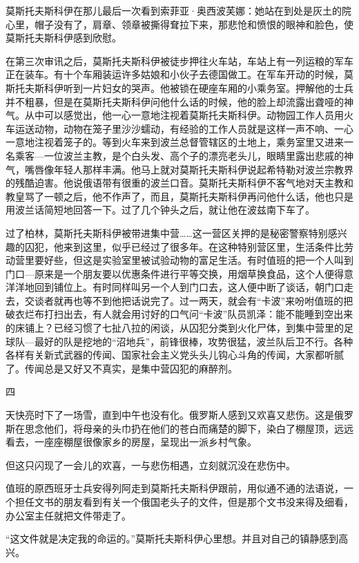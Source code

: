 莫斯托夫斯科伊在那儿最后一次看到索菲亚·奥西波芙娜：她站在到处是灰土的院心里，帽子没有了，肩章、领章被撕得耷拉下来，那悲怆和愤恨的眼神和脸色，使莫斯托夫斯科伊感到欣慰。

在第三次审讯之后，莫斯托夫斯科伊被徒步押往火车站，车站上有一列运粮的军车正在装车。有十个车厢装运许多姑娘和小伙子去德国做工。在军车开动的时候，莫斯托夫斯科伊听到一片妇女的哭声。他被锁在硬座车厢的小乘务室。押解他的士兵并不粗暴，但是在莫斯托夫斯科伊问他什么话的时候，他的脸上却流露出聋哑的神气。从中可以感觉出，他一心一意地注视着莫斯托夫斯科伊。动物园工作人员用火车运送动物，动物在笼子里沙沙蠕动，有经验的工作人员就是这样一声不响、一心一意地注视着笼子的。等到火车来到波兰总督管辖区的土地上，乘务室里又进来一名乘客—一位波兰主教，是个白头发、高个子的漂亮老头儿，眼睛里露出悲戚的神气，嘴唇像年轻人那样丰满。他马上就对莫斯托夫斯科伊说起希特勒对波兰宗教界的残酷迫害。他说俄语带有很重的波兰口音。莫斯托夫斯科伊不客气地对天主教和教皇骂了一顿之后，他不作声了，而且，莫斯托夫斯科伊再问他什么话，他也只是用波兰话简短地回答一下。过了几个钟头之后，就让他在波兹南下车了。

过了柏林，莫斯托夫斯科伊被带进集中营……这一营区关押的是秘密警察特别感兴趣的囚犯，他来到这里，似乎已经过了很多年。在这种特别营区里，生活条件比劳动营里要好些，但这是实验室里被试验动物的富足生活。有时值班的把一个人叫到门口—原来是一个朋友要以优惠条件进行平等交换，用烟草换食品，这个人便得意洋洋地回到铺位上。有时同样叫另一个人到门口去，这人便中断了谈话，朝门口走去，交谈者就再也等不到他把话说完了。过一两天，就会有“卡波”来吩咐值班的把破衣烂布打扫出去，有人就会用讨好的口气问“卡波”队员凯泽：能不能睡到空出来的床铺上？已经习惯了七扯八拉的闲谈，从囚犯分类到火化尸体，到集中营里的足球队—最好的队是挖地的“沼地兵”，前锋很棒，攻势很猛，波兰队后卫不行。各种各样有关新式武器的传闻、国家社会主义党头头儿钩心斗角的传闻，大家都听腻了。传闻总是又好又不真实，是集中营囚犯的麻醉剂。

四

天快亮时下了一场雪，直到中午也没有化。俄罗斯人感到又欢喜又悲伤。这是俄罗斯在思念他们，将母亲的头巾扔在他们的苍白而痛楚的脚下，染白了棚屋顶，远远看去，一座座棚屋很像家乡的房屋，呈现出一派乡村气象。

但这只闪现了一会儿的欢喜，一与悲伤相遇，立刻就沉没在悲伤中。

值班的原西班牙士兵安得列阿走到莫斯托夫斯科伊跟前，用似通不通的法语说，一个担任文书的朋友看到有关一个俄国老头子的文件，但是那个文书没来得及细看，办公室主任就把文件带走了。

“这文件就是决定我的命运的。”莫斯托夫斯科伊心里想。并且对自己的镇静感到高兴。


